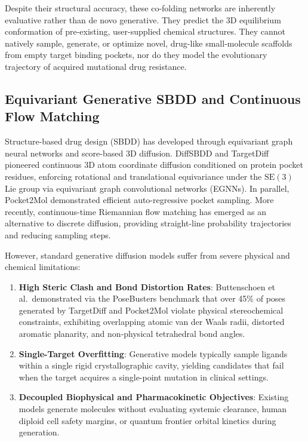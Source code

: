 \documentclass[10pt,journal,compsoc]{IEEEtran}
\begin{document}
Despite their structural accuracy, these co-folding networks are inherently evaluative rather than de novo generative. They predict the 3D equilibrium conformation of pre-existing, user-supplied chemical structures. They cannot natively sample, generate, or optimize novel, drug-like small-molecule scaffolds from empty target binding pockets, nor do they model the evolutionary trajectory of acquired mutational drug resistance.

\subsection{Equivariant Generative SBDD and Continuous Flow Matching}
Structure-based drug design (SBDD) has developed through equivariant graph neural networks and score-based 3D diffusion. DiffSBDD \cite{schneuing2022diffsbdd} and TargetDiff \cite{guan2023targetdiff} pioneered continuous 3D atom coordinate diffusion conditioned on protein pocket residues, enforcing rotational and translational equivariance under the $\mathrm{SE}(3)$ Lie group via equivariant graph convolutional networks (EGNNs). In parallel, Pocket2Mol \cite{peng2022pocket2mol} demonstrated efficient auto-regressive pocket sampling. More recently, continuous-time Riemannian flow matching \cite{lipman2023flow,albergo2023building} has emerged as an alternative to discrete diffusion, providing straight-line probability trajectories and reducing sampling steps.

However, standard generative diffusion models suffer from severe physical and chemical limitations:
\begin{enumerate}
    \item \textbf{High Steric Clash and Bond Distortion Rates}: Buttenschoen et al.\ demonstrated via the PoseBusters benchmark \cite{van2023posebusters} that over 45\% of poses generated by TargetDiff and Pocket2Mol violate physical stereochemical constraints, exhibiting overlapping atomic van der Waals radii, distorted aromatic planarity, and non-physical tetrahedral bond angles.
    \item \textbf{Single-Target Overfitting}: Generative models typically sample ligands within a single rigid crystallographic cavity, yielding candidates that fail when the target acquires a single-point mutation in clinical settings.
    \item \textbf{Decoupled Biophysical and Pharmacokinetic Objectives}: Existing models generate molecules without evaluating systemic clearance, human diploid cell safety margins, or quantum frontier orbital kinetics during generation.
\end{enumerate}
\end{document}
